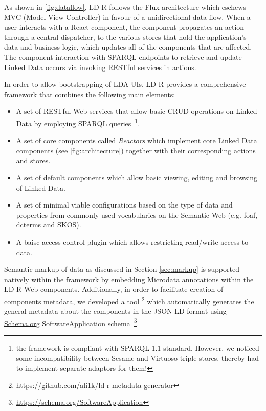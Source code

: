 \documentclass{acm_proc_article-sp}
\begin{document}
As shown in \autoref{fig:dataflow}, LD-R follows the Flux architecture which eschews MVC (Model-View-Controller) in favour of a unidirectional data flow. 
When a user interacts with a React component, the component propagates an action through a central dispatcher, to the various stores that hold the application's data and business logic, which updates all of the components that are affected. 
The component interaction with SPARQL endpoints to retrieve and update Linked Data occurs via invoking RESTful services in actions.

In order to allow bootstrapping of LDA UIs, LD-R provides a comprehensive framework that combines the following main elements:
\begin{itemize}

\item A set of RESTful Web services that allow basic CRUD operations on Linked Data by  employing SPARQL queries~\footnote{the framework is compliant with SPARQL 1.1 standard. However, we noticed some incompatibility between Sesame and Virtuoso triple stores. thereby had to implement separate adaptors for them!}.

\item A set of core components called \emph{Reactors} which implement core Linked Data components (see \autoref{fig:architecture}) together with their corresponding actions and stores.

\item A set of default components which allow basic viewing, editing and browsing of Linked Data.

\item A set of minimal viable configurations based on the type of data and properties from commonly-used vocabularies on the Semantic Web (e.g. foaf, dcterms and SKOS).

\item A baisc access control plugin which allows restricting read/write access to data.

\end{itemize}


Semantic markup of data as discussed in Section \ref{sec:markup} is supported natively within the framework by embedding Microdata annotations within the LD-R Web components.
Additionally, in order to facilitate creation of components metadata, we developed a tool \footnote{\url{https://github.com/ali1k/ld-r-metadata-generator}} which automatically generates the general metadata about the components in the JSON-LD format using \url{Schema.org} SoftwareApplication schema~\footnote{\url{https://schema.org/SoftwareApplication}}.
\end{document}
